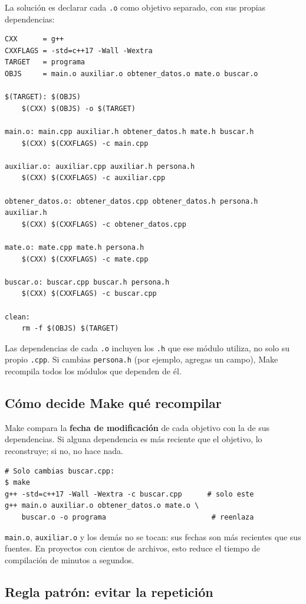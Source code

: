 \documentclass[12pt, oneside]{article}
\begin{document}
La solución es declarar cada \texttt{.o} como objetivo separado, con sus
propias dependencias:

\begin{verbatim}
CXX      = g++
CXXFLAGS = -std=c++17 -Wall -Wextra
TARGET   = programa
OBJS     = main.o auxiliar.o obtener_datos.o mate.o buscar.o

$(TARGET): $(OBJS)
	$(CXX) $(OBJS) -o $(TARGET)

main.o: main.cpp auxiliar.h obtener_datos.h mate.h buscar.h
	$(CXX) $(CXXFLAGS) -c main.cpp

auxiliar.o: auxiliar.cpp auxiliar.h persona.h
	$(CXX) $(CXXFLAGS) -c auxiliar.cpp

obtener_datos.o: obtener_datos.cpp obtener_datos.h persona.h auxiliar.h
	$(CXX) $(CXXFLAGS) -c obtener_datos.cpp

mate.o: mate.cpp mate.h persona.h
	$(CXX) $(CXXFLAGS) -c mate.cpp

buscar.o: buscar.cpp buscar.h persona.h
	$(CXX) $(CXXFLAGS) -c buscar.cpp

clean:
	rm -f $(OBJS) $(TARGET)
\end{verbatim}

Las dependencias de cada \texttt{.o} incluyen los \texttt{.h} que ese
módulo utiliza, no solo su propio \texttt{.cpp}.  Si cambias
\texttt{persona.h} (por ejemplo, agregas un campo), Make recompila todos
los módulos que dependen de él.

\subsection{Cómo decide Make qué recompilar}

Make compara la \textbf{fecha de modificación} de cada objetivo con la de
sus dependencias.  Si alguna dependencia es más reciente que el objetivo,
lo reconstruye; si no, no hace nada.

\begin{verbatim}
# Solo cambias buscar.cpp:
$ make
g++ -std=c++17 -Wall -Wextra -c buscar.cpp      # solo este
g++ main.o auxiliar.o obtener_datos.o mate.o \
    buscar.o -o programa                         # reenlaza
\end{verbatim}

\texttt{main.o}, \texttt{auxiliar.o} y los demás no se tocan: sus fechas
son más recientes que sus fuentes.  En proyectos con cientos de archivos,
esto reduce el tiempo de compilación de minutos a segundos.

\subsection{Regla patrón: evitar la repetición}
\end{document}
